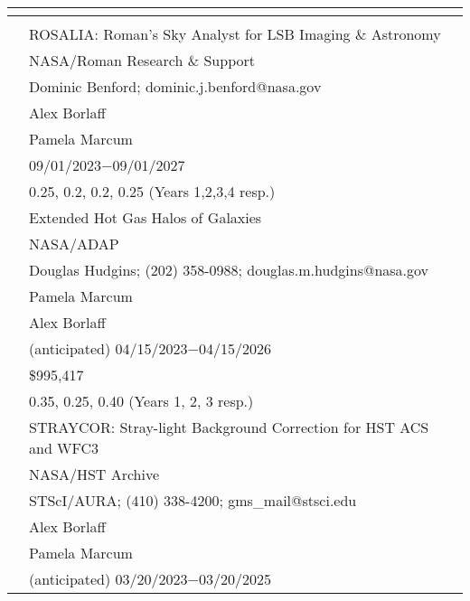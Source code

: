 \documentclass{CORE-AAS/aastex631}
\begin{document}
\begin{longtable}{T}   %
\hline
{}\\ 
\hline
\\
\hline
&ROSALIA: Roman's Sky Analyst for LSB Imaging \& Astronomy\\ 
&NASA/Roman Research \& Support\\ 
&Dominic Benford; dominic.j.benford@nasa.gov\\ 
&Alex Borlaff\\
&Pamela Marcum\\
&09/01/2023$-$09/01/2027\\
&0.25, 0.2, 0.2, 0.25 (Years 1,2,3,4 resp.)\\
 \hline%
&Extended Hot Gas Halos of Galaxies\\ 
&NASA/ADAP\\ 
&Douglas Hudgins; (202) 358-0988; douglas.m.hudgins@nasa.gov\\ 
&Pamela Marcum\\
&Alex Borlaff\\
&(anticipated) 04/15/2023$-$04/15/2026\\
&\$995,417\\
&0.35, 0.25, 0.40 (Years 1, 2, 3 resp.)\\
 \hline%
&STRAYCOR: Stray-light Background Correction for HST ACS and WFC3\\ 
&NASA/HST Archive\\ 
&STScI/AURA; (410) 338-4200; gms\_mail@stsci.edu\\ 
&Alex Borlaff\\
&Pamela Marcum\\
&(anticipated) 03/20/2023$-$03/20/2025\\

\end{longtable}
\end{document}
